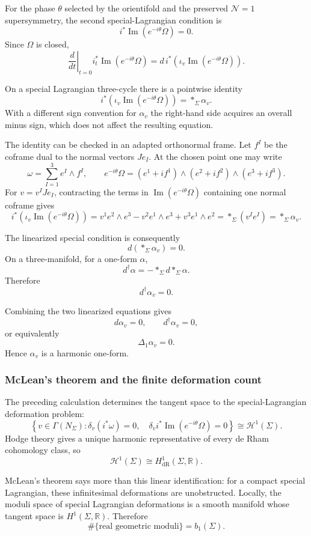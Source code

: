 \documentclass[
  10pt,
  a4paper,
  openany]{book}
\begin{document}
For the phase \(\theta\) selected by the orientifold and the preserved
\(\mathcal N=1\) supersymmetry, the second special-Lagrangian condition
is \[
i^*\operatorname{Im}(e^{-i\theta}\Omega)=0.
\] Since \(\Omega\) is closed, \[
\left.\frac{d}{dt}\right|_{t=0}
i_t^*\operatorname{Im}(e^{-i\theta}\Omega)
=d\,i^*\!\left(
\iota_v\operatorname{Im}(e^{-i\theta}\Omega)
\right).
\]

On a special Lagrangian three-cycle there is a pointwise identity \[
i^*\!\left(
\iota_v\operatorname{Im}(e^{-i\theta}\Omega)
\right)
=*_\Sigma\alpha_v.
\] With a different sign convention for \(\alpha_v\) the right-hand side
acquires an overall minus sign, which does not affect the resulting
equation.

The identity can be checked in an adapted orthonormal frame. Let \(f^I\)
be the coframe dual to the normal vectors \(Je_I\). At the chosen point
one may write \[
\omega=\sum_{I=1}^3 e^I\wedge f^I,
\qquad
e^{-i\theta}\Omega
=(e^1+if^1)\wedge(e^2+if^2)\wedge(e^3+if^3).
\] For \(v=v^IJe_I\), contracting the terms in
\(\operatorname{Im}(e^{-i\theta}\Omega)\) containing one normal coframe
gives \[
i^*(\iota_v\operatorname{Im}(e^{-i\theta}\Omega))
=v^1e^2\wedge e^3-v^2e^1\wedge e^3+v^3e^1\wedge e^2
=*_\Sigma(v^Ie^I)
=*_\Sigma\alpha_v.
\]

The linearized special condition is consequently \[
d(*_\Sigma\alpha_v)=0.
\] On a three-manifold, for a one-form \(\alpha\), \[
d^\dagger\alpha=-*_\Sigma d *_\Sigma\alpha.
\] Therefore \[
\boxed{d^\dagger\alpha_v=0}.
\]

Combining the two linearized equations gives \[
d\alpha_v=0,
\qquad
d^\dagger\alpha_v=0,
\] or equivalently \[
\Delta_1\alpha_v=0.
\] Hence \(\alpha_v\) is a harmonic one-form.

\subsubsection{McLean's theorem and the finite deformation
count}\label{mcleans-theorem-and-the-finite-deformation-count}

The preceding calculation determines the tangent space to the
special-Lagrangian deformation problem: \[
\left\{
v\in\Gamma(N_\Sigma):
\delta_v(i^*\omega)=0,
\quad
\delta_v i^*\operatorname{Im}(e^{-i\theta}\Omega)=0
\right\}
\cong
\mathcal H^1(\Sigma).
\] Hodge theory gives a unique harmonic representative of every de Rham
cohomology class, so \[
\mathcal H^1(\Sigma)\cong H^1_{\mathrm{dR}}(\Sigma,\mathbb R).
\]

McLean's theorem says more than this linear identification: for a
compact special Lagrangian, these infinitesimal deformations are
unobstructed. Locally, the moduli space of special Lagrangian
deformations is a smooth manifold whose tangent space is
\(H^1(\Sigma,\mathbb R)\). Therefore \[
\boxed{
\#\{\text{real geometric moduli}\}
=b_1(\Sigma)
}.
\]
\end{document}
